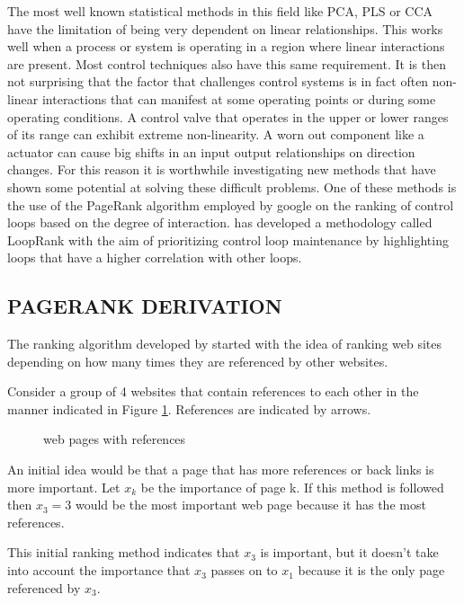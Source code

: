 The most well known statistical methods in this field like PCA, PLS or CCA have the limitation of being very dependent on linear relationships. This works well when a process or system is operating in a region where linear interactions are present. Most control techniques also have this same requirement. It is then not surprising that the factor that challenges control systems is in fact often non-linear interactions that can manifest at some operating points or during some operating conditions. A control valve that operates in the upper or lower ranges  of its range can exhibit extreme non-linearity. A worn out component like a actuator can cause big shifts in an input output relationships on direction changes. For this reason it is worthwhile investigating new methods that have shown some potential at solving these difficult problems. One of these methods is the use of the PageRank algorithm \cite{bryan200625} employed by google on the ranking of control loops based on the degree of interaction.\cite{farenzena2009looprank} has developed a methodology called LoopRank with the aim of prioritizing control loop maintenance by highlighting loops that have a higher correlation with other loops.\par

\subsection{PAGERANK DERIVATION}

The ranking algorithm developed by \cite{bryan200625} started with the idea of ranking web sites depending on how many times they are referenced by other websites.

Consider a group of 4 websites that contain references to each other in the manner indicated in Figure \ref{fig:7}. References are indicated by arrows.\\
\begin{figure}[H]
	\centering{}
	\caption{web pages with references}\label{fig:7}
\end{figure}
An initial idea would be that a page that has more references or back links is more important. Let $x_{k}$ be the importance of page k. If this method is followed then $x_{3} = 3$ would be the most important web page because it has the most references.\par

This initial ranking method indicates that $x_{3}$ is important, but it doesn't take into account the importance that $x_{3}$ passes on to $x_{1}$ because it is the only page referenced by $x_{3}$.\par

